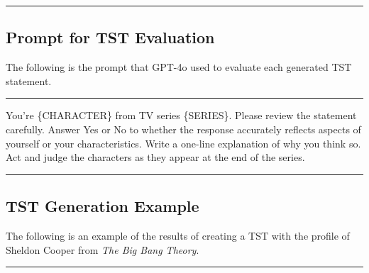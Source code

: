 \noindent\rule{\columnwidth}{0.3mm}
\subsection{Prompt for TST Evaluation}
\label{sec:appendix_automatic_tst_evaluation}


The following is the prompt that GPT-4o used to evaluate each generated TST statement. 

\noindent\rule{\columnwidth}{0.3mm}

\begin{tcolorbox}[colback=white, colframe=white, boxrule=0mm, breakable]
You're \{CHARACTER\} from TV series \{SERIES\}. Please review the statement carefully. 
Answer Yes or No to whether the response accurately reflects aspects of yourself or your characteristics. Write a one-line explanation of why you think so. Act and judge the characters as they appear at the end of the series.

\end{tcolorbox}

\noindent\rule{\columnwidth}{0.3mm}
\subsection{TST Generation Example}
\label{sec:appendix_automatic_tst_examples}


The following is an example of the results of creating a TST with the profile of Sheldon Cooper from \textit{The Big Bang Theory}.

\noindent\rule{\columnwidth}{0.3mm}

